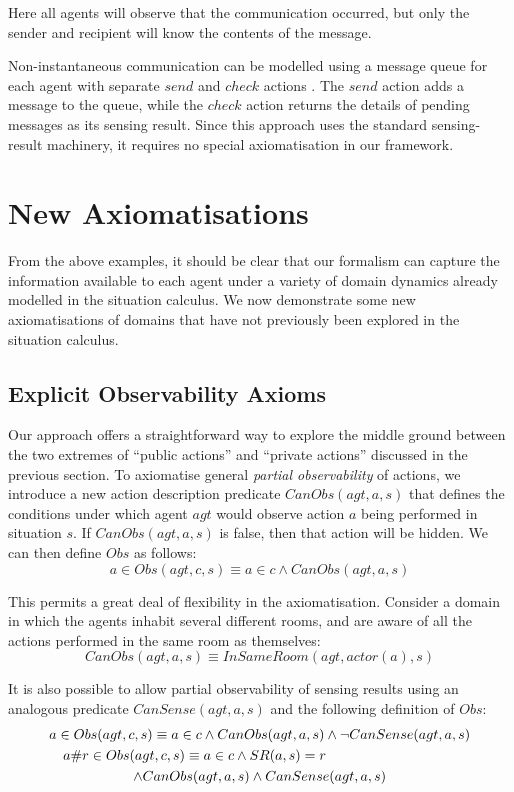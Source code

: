 Here all agents will observe that the communication occurred, but
only the sender and recipient will know the contents of the message.

Non-instantaneous communication can be modelled using a message queue
for each agent with separate $send$ and $check$ actions \citep{Lesperance99sitcalc_approach}.
The $send$ action adds a message to the queue, while the $check$
action returns the details of pending messages as its sensing result.
Since this approach uses the standard sensing-result machinery, it
requires no special axiomatisation in our framework.


\section{New Axiomatisations\label{sec:Observations:Axiomatising-extended}}

From the above examples, it should be clear that our formalism can
capture the information available to each agent under a variety of
domain dynamics already modelled in the situation calculus. We now
demonstrate some new axiomatisations of domains that have not previously
been explored in the situation calculus.


\subsection{Explicit Observability Axioms\label{sec:Observations:CanObs}}

Our approach offers a straightforward way to explore the middle ground
between the two extremes of {}``public actions'' and {}``private
actions'' discussed in the previous section. To axiomatise general
\emph{partial observability} of actions, we introduce a new action
description predicate $CanObs(agt,a,s)$ that defines the conditions
under which agent $agt$ would observe action $a$ being performed
in situation $s$. If $CanObs(agt,a,s)$ is false, then that action
will be hidden. We can then define $Obs$ as follows:\[
a\in Obs(agt,c,s)\equiv a\in c\wedge CanObs(agt,a,s)\]


This permits a great deal of flexibility in the axiomatisation. Consider
a domain in which the agents inhabit several different rooms, and
are aware of all the actions performed in the same room as themselves:\[
CanObs(agt,a,s)\equiv InSameRoom(agt,actor(a),s)\]


It is also possible to allow partial observability of sensing results
using an analogous predicate $CanSense(agt,a,s)$ and the following
definition of $Obs$:\begin{multline*}
a\in Obs(agt,c,s)\equiv a\in c\wedge CanObs(agt,a,s)\wedge\neg CanSense(agt,a,s)\\
\shoveleft{a\#r\in Obs(agt,c,s)\equiv a\in c\wedge SR(a,s)=r}\\
\wedge CanObs(agt,a,s)\wedge CanSense(agt,a,s)\end{multline*}


